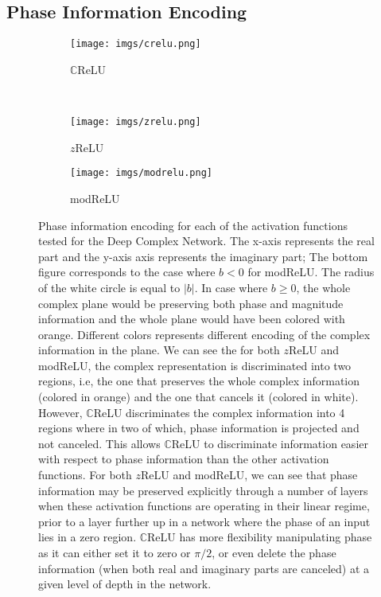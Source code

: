 \documentclass{article}
\begin{document}
\subsection{Phase Information Encoding}\label{phase_encoding}
\begin{figure}[h]
\centering
\begin{subfigure}[t]{0.5\textwidth}
\centering
\texttt{[image: imgs/crelu.png]}
\caption{$\mathbb{C}$ReLU}
    \end{subfigure}~ 
    \begin{subfigure}[t]{0.5\textwidth}
    \centering
\texttt{[image: imgs/zrelu.png]}
\caption{$z$ReLU}
 	\end{subfigure}
    \begin{subfigure}[t]{0.5\textwidth}
    \centering
\texttt{[image: imgs/modrelu.png]}
\caption{modReLU}
 \end{subfigure}
	\caption{Phase information encoding for each of the activation functions tested for the Deep Complex Network. The x-axis represents the real part and the y-axis axis represents the imaginary part; The bottom figure corresponds to the case where $b < 0$ for modReLU. The radius of the white circle is equal to $|b|$. In case where $b \geq{0}$, the whole complex plane would be preserving both phase and magnitude information and the whole plane would have been colored with orange. Different colors represents different encoding of the complex information in the plane. We can see the for both $z$ReLU and modReLU, the complex representation is discriminated into two regions, i.e, the one that preserves the whole complex information (colored in orange) and the one that cancels it (colored in white). However, $\mathbb{C}$ReLU discriminates the complex information into 4 regions where in two of which, phase information is projected and not canceled. This allows $\mathbb{C}$ReLU to discriminate information easier with respect to phase information than the other activation functions. For both $z$ReLU and modReLU, we can see that phase information may be preserved explicitly through a number of layers when these activation functions are operating in their linear regime, prior to a layer further up in a network where the phase of an input lies in a zero region. $\mathbb{C}$ReLU has more flexibility manipulating phase as it can either set it to zero or $\pi/2$, or even delete the phase information (when both real and imaginary parts are canceled) at a given level of depth in the network.}
\end{figure}
\end{document}
